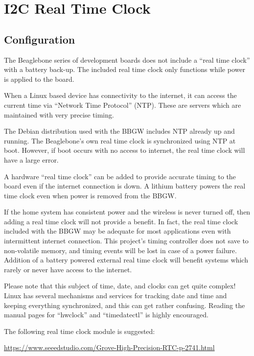 \chapter{I2C Real Time Clock}

\section{Configuration}
The Beaglebone series of development boards does not include a ``real time clock'' with a battery back-up.  The included real time clock only functions while power is applied to the board.

When a Linux based device has connectivity to the internet, it can access the current time via ``Network Time Protocol'' (NTP).  These are servers which are maintained with very precise timing.

The Debian distribution used with the BBGW includes NTP already up and running.  The Beaglebone's own real time clock is synchronized using NTP at boot.  However, if boot occurs with no access to internet, the real time clock will have a large error.

A hardware ``real time clock'' can be added to provide accurate timing to the board even if the internet connection is down.  A lithium battery powers the real time clock even when power is removed from the BBGW.

If the home system has consistent power and the wireless is never turned off, then adding a real time clock will not provide a benefit.  In fact, the real time clock included with the BBGW may be adequate for most applications even with intermittent internet connection.  This project's timing controller does not save to non-volatile memory, and timing events will be lost in case of a power failure.  Addition of a battery powered external real time clock will benefit systems which rarely or never have access to the internet.

Please note that this subject of time, date, and clocks can get quite complex!  Linux has several mechanisms and services for tracking date and time and keeping everything synchronized, and this can get rather confusing.  Reading the manual pages for ``hwclock'' and ``timedatectl'' is highly encouraged.

The following real time clock module is suggested:

\url{https://www.seeedstudio.com/Grove-High-Precision-RTC-p-2741.html}

